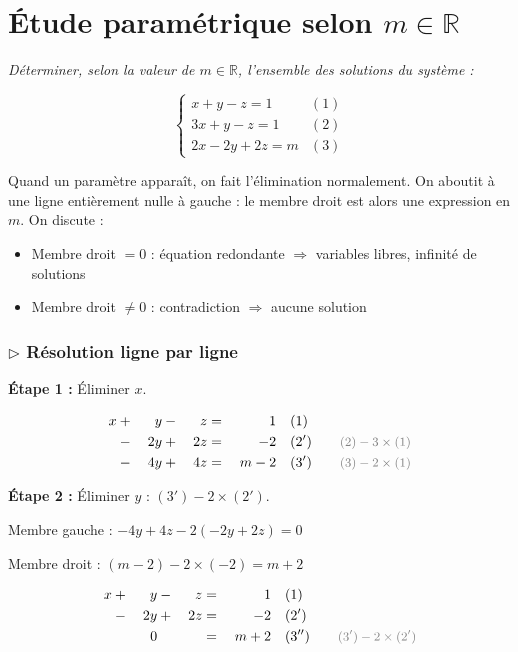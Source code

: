 \documentclass[12pt,a4paper]{article}
\newcommand{\ann}[1]{\qquad\textcolor{opcolor}{\text{\small #1}}}
\begin{document}
\section{Étude paramétrique selon $m \in \mathbb{R}$}

\textit{Déterminer, selon la valeur de $m \in \mathbb{R}$, l'ensemble des solutions du système :}

\[
\begin{cases}
  x + y - z = 1 & (1)\\
  3x + y - z = 1 & (2)\\
  2x - 2y + 2z = m & (3)
\end{cases}
\]

\begin{methode}
Quand un paramètre apparaît, on fait l'élimination normalement. On aboutit à une ligne entièrement nulle à gauche : le membre droit est alors une expression en $m$. On discute :
\begin{itemize}[noitemsep]
  \item Membre droit $= 0$ : équation redondante $\Rightarrow$ variables libres, infinité de solutions
  \item Membre droit $\neq 0$ : contradiction $\Rightarrow$ aucune solution
\end{itemize}
\end{methode}

\subsubsection*{$\triangleright$ Résolution ligne par ligne}

\textbf{Étape 1 :} Éliminer $x$.

\begin{alignat*}{4}
  x &{}+{}&  y  &{}-{}& z  &{}={}&  1    &\quad (1)\\
    &{}-{}& 2y  &{}+{}& 2z &{}={}& -2    &\quad (2') \ann{$(2)-3\times(1)$}\\
    &{}-{}& 4y  &{}+{}& 4z &{}={}& m-2   &\quad (3') \ann{$(3)-2\times(1)$}
\end{alignat*}

\textbf{Étape 2 :} Éliminer $y$ : $(3') - 2\times(2')$.

Membre gauche : $-4y+4z - 2(-2y+2z) = 0$

Membre droit : $(m-2) - 2\times(-2) = m + 2$

\begin{alignat*}{4}
  x &{}+{}&  y  &{}-{}& z  &{}={}& 1    &\quad (1)\\
    &{}-{}& 2y  &{}+{}& 2z &{}={}& -2   &\quad (2')\\
    &     &  0  &     &    &{}={}& m+2  &\quad (3'') \ann{$(3')-2\times(2')$}
\end{alignat*}
\end{document}
